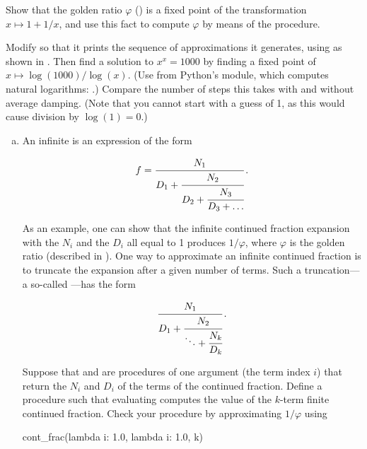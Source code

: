 \begin{exerciseGroup}
\label{Exercise 1.35}
 Show that the golden ratio
\( \varphi \) () is a fixed point of the transformation
\( x \mapsto 1 + 1 / x \), and use this fact to compute \( \varphi \) by means
of the  procedure.

\label{Exercise 1.36}
 Modify  so that
it prints the sequence of approximations it generates, using  as
shown in .  Then find a
solution to \( x^x = 1000 \) by finding a fixed point of \( x \mapsto
\log(1000) / \log(x) \).  (Use  from Python's  module,
which computes natural logarithms: .)  Compare the number of steps
this takes with and without average damping.  (Note that you cannot start
 with a guess of 1, as this would cause division by
\( \log(1) = 0 \).)

\label{Exercise 1.37}
 \begin{enumerate}[a.]

\item
An infinite  is an expression of the form

$$ {f} = \cfrac{N_1}{D_1 + \cfrac{N_2}{D_2 + \cfrac{N_3}{D_3 + \dots}}}\,. $$

As an example, one can show that the infinite continued fraction expansion with
the \( N_i \) and the \( D_i \) all equal to 1 produces \( 1 / \varphi \), where
\( \varphi \) is the golden ratio (described in ).  One way to
approximate an infinite continued fraction is to truncate the expansion after a
given number of terms.  Such a truncation---a so-called ---has the form

$$ \cfrac{N_1}{D_1 + \cfrac{N_2}{\ddots + \cfrac{N_k}{D_k}}}\,. $$

Suppose that  and  are procedures of one argument (the term
index \( i \)) that return the \( N_i \) and \( D_i \) of the terms of the
continued fraction.  Define a procedure  such that evaluating
 computes the value of the \( k \)-term finite
continued fraction.  Check your procedure by approximating \( 1 / \varphi \) using

\begin{codeBlock}
cont_frac(lambda i: 1.0,
          lambda i: 1.0,
          k)
\end{codeBlock}


\end{enumerate}
\end{exerciseGroup}
